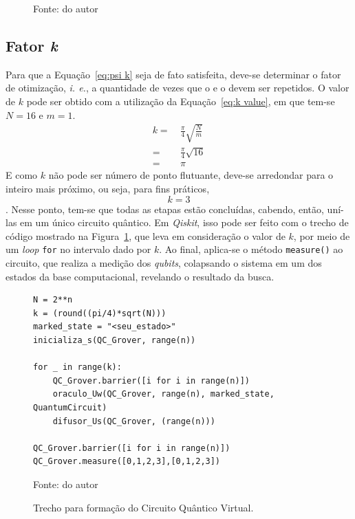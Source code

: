 \begin{figure}[ht!]
    \vspace{0.3em}
    {\small Fonte: do autor} 
\end{figure}

\subsection{Fator \emph{k}}

Para que a Equação~\ref{eq:psi k} seja de fato satisfeita, deve-se determinar o fator de otimização, \emph{i. e.}, a quantidade de vezes que o  e o  devem ser repetidos. O valor de $k$ pode ser obtido com a utilização da Equação~\ref{eq:k value}, em que tem-se $N=16$ e $m=1$.
%
\begin{align*}
    k =&~ \frac{\pi}{4}\sqrt{\frac{N}{m}}\\
    =&~ \frac{\pi}{4}\sqrt{16}\\
    =&~ \pi
\end{align*}
E como $k$ não pode ser número de ponto flutuante, deve-se arredondar para o inteiro mais próximo, ou seja, para fins práticos,
\begin{equation}
    k = 3
    \label{eq: k = 3}
\end{equation}.
Nesse ponto, tem-se que todas as etapas estão concluídas, cabendo, então, uní-las em um único circuito qu\^{a}ntico. Em \emph{Qiskit}, isso pode ser feito com o trecho de código mostrado na Figura~\ref{cod: geraCircuitoCompleto}, que leva em consideração o valor de $k$, por meio de um \textit{loop} \verb|for| no intervalo dado por $k$. Ao final, aplica-se o método \verb|measure()| ao circuito, que realiza a medição dos \textit{qubits}, colapsando o sistema em um dos estados da base computacional, revelando o resultado da busca.

\begin{figure}[!htb]
\centering
\caption{Trecho para formação do Circuito Quântico Virtual.} 
\begin{verbatim}
N = 2**n
k = (round((pi/4)*sqrt(N)))
marked_state = "<seu_estado>"
inicializa_s(QC_Grover, range(n))

for _ in range(k):
    QC_Grover.barrier([i for i in range(n)])
    oraculo_Uw(QC_Grover, range(n), marked_state, QuantumCircuit)
    difusor_Us(QC_Grover, (range(n)))

QC_Grover.barrier([i for i in range(n)])
QC_Grover.measure([0,1,2,3],[0,1,2,3])
\end{verbatim} 
{\small Fonte: do autor} 
\label{cod: geraCircuitoCompleto} 
\end{figure}


